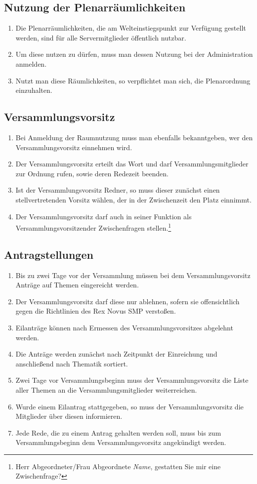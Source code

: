 \documentclass{article}
\begin{document}
\subsection{Nutzung der Plenarräumlichkeiten}
\begin{enumerate}[(1)]
	\item Die Plenarräumlichkeiten, die am Welteinstiegspunkt zur Verfügung gestellt werden, sind für alle Servermitglieder öffentlich nutzbar.
	\item Um diese nutzen zu dürfen, muss man dessen Nutzung bei der Administration anmelden.
	\item Nutzt man diese Räumlichkeiten, so verpflichtet man sich, die Plenarordnung einzuhalten.
\end{enumerate}

\subsection{Versammlungsvorsitz}
\begin{enumerate}[(1)]
	\item Bei Anmeldung der Raumnutzung muss man ebenfalls bekanntgeben, wer den Versammlungsvorsitz einnehmen wird.
	\item Der Versammlungsvorsitz erteilt das Wort und darf Versammlungsmitglieder zur Ordnung rufen, sowie deren Redezeit beenden.
	\item Ist der Versammlungsvorsitz Redner, so muss dieser zunächst einen stellvertretenden Vorsitz wählen, der in der Zwischenzeit den Platz einnimmt.
	\item Der Versammlungsvorsitz darf auch in seiner Funktion als Versammlungsvorsitzender Zwischenfragen stellen.\footnote{Herr Abgeordneter/Frau Abgeordnete \textit{Name}, gestatten Sie mir eine Zwischenfrage?}
\end{enumerate}

\subsection{Antragstellungen}
\begin{enumerate}[(1)]
	\item Bis zu zwei Tage vor der Versammlung müssen bei dem Versammlungsvorsitz Anträge auf Themen eingereicht werden.
	\item Der Versammlungsvorsitz darf diese nur ablehnen, sofern sie offensichtlich gegen die Richtlinien des Rex Novus SMP verstoßen.
	\item Eilanträge können nach Ermessen des Versammlungsvorsitzes abgelehnt werden.
	\item Die Anträge werden zunächst nach Zeitpunkt der Einreichung und anschließend nach Thematik sortiert.
	\item Zwei Tage vor Versammlungsbeginn muss der Versammlungsvorsitz die Liste aller Themen an die Versammlungsmitglieder weiterreichen.
	\item Wurde einem Eilantrag stattgegeben, so muss der Versammlungsvorsitz die Mitglieder über diesen informieren.
	\item Jede Rede, die zu einem Antrag gehalten werden soll, muss bis zum Versammlungsbeginn dem Versammlungsvorsitz angekündigt werden.
\end{enumerate}
\end{document}
